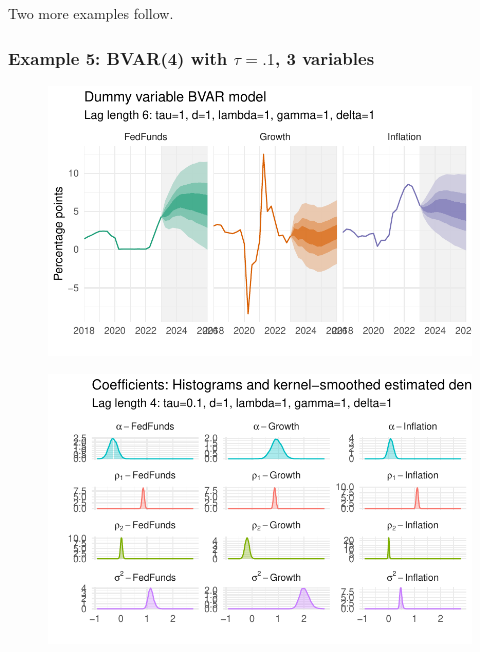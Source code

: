 \documentclass[
  letterpaper,
]{book}
\begin{document}
Two more examples follow.

\hypertarget{example-5-bvar4-with-tau.1-3-variables}{%
\subsubsection{\texorpdfstring{Example 5: BVAR(4) with \(\tau=.1\), 3
variables}{Example 5: BVAR(4) with \textbackslash tau=.1, 3 variables}}\label{example-5-bvar4-with-tau.1-3-variables}}

\begin{figure}

{\centering \includegraphics{./BVAR_files/figure-pdf/estim-1.pdf}

}

\end{figure}

\begin{figure}

{\centering \includegraphics{./BVAR_files/figure-pdf/unnamed-chunk-12-1.pdf}

}

\end{figure}
\end{document}
